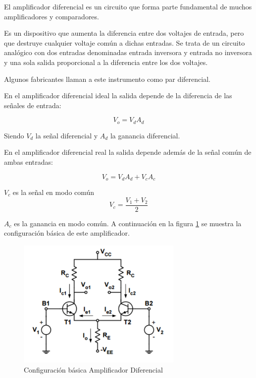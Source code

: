El amplificador diferencial es un circuito que forma parte fundamental de muchos amplificadores y comparadores.

Es un dispositivo que aumenta la diferencia entre dos voltajes de entrada, pero que destruye cualquier voltaje común a dichas entradas. Se trata de un circuito analógico con dos entradas denominadas entrada inversora y entrada no inversora y una sola salida proporcional a la diferencia entre los dos voltajes.

Algunos fabricantes llaman a este instrumento como par diferencial.

En el amplificador diferencial ideal la salida depende de la diferencia de las señales de entrada:

\begin{equation}
    V_o=V_d A_d
\end{equation}

Siendo $V_d$ la señal diferencial y  $A_d$ la ganancia diferencial.

En el amplificador diferencial real la salida depende además de la señal común de ambas entradas:

\begin{equation}
    V_o=V_d A_d+ V_c A_c
\end{equation}

$V_c$ es la señal en modo común
\begin{equation}
    V_c = \dfrac{V_1+V_2}{2}
\end{equation}

$A_c$ es la ganancia en modo común.
A continuación en la figura \ref{fig:diferencial} se muestra la configuración básica de este amplificador.

\begin{figure}[H]
    \centering
    \includegraphics[width=8cm]{Imagenes/diferencial.png}
    \caption{Configuración básica Amplificador Diferencial}
    \label{fig:diferencial}
\end{figure}

